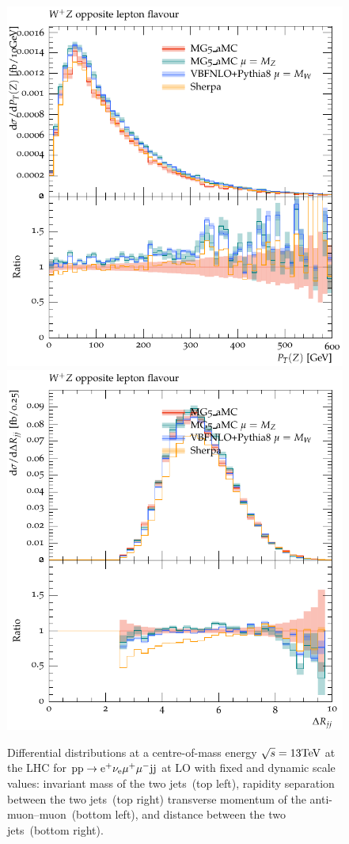 \begin{figure}[htbp]
\begin{center}
   \includegraphics[scale=0.65]{figs/WpZ_OF_ZPt}
   \includegraphics[scale=0.65]{figs/WpZ_OF_dRjj}
\caption{Differential distributions at a centre-of-mass energy $\sqrt{s}=13{\rm TeV}$ at the LHC for ${\rm p} {\rm p}
  \to {\rm e}^+  \nu_{\rm e}  \mu^+ \mu^- {\rm j} {\rm j}$ at LO with fixed and dynamic scale values:  
                invariant mass of the two jets~(top left),
                rapidity separation between the two jets~(top right)
                transverse momentum of the anti-muon--muon~(bottom left), and
                distance between the two jets~(bottom right).}
\label{vbs_fig_shower_4a}
\end{center}
\end{figure}

